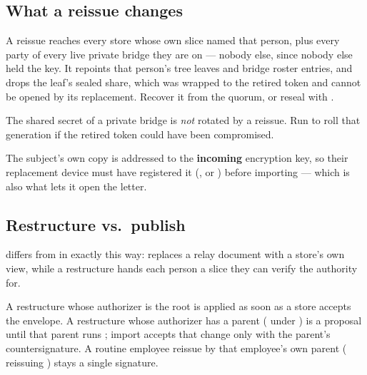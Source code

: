 \subsection{What a reissue changes}

A reissue reaches every store whose own slice named that person, plus every
party of every live private bridge they are on --- nobody else, since
nobody else held the key. It repoints that person's tree leaves and bridge
roster entries, and drops the leaf's sealed share, which was wrapped to the
retired token and cannot be opened by its replacement. Recover it from the
quorum, or reseal with .

\begin{cautionBox}
The shared secret of a private bridge is \emph{not} rotated by a reissue.
Run  to roll that generation if the
retired token could have been compromised.
\end{cautionBox}

The subject's own copy is addressed to the \textbf{incoming} encryption
key, so their replacement device must have registered it (, or ) before importing --- which is also what
lets it open the letter.

\subsection{Restructure vs.\ publish}

 differs from  in exactly this
way:  replaces a relay document with a store's own view,
while a restructure hands each person a slice they can verify the
authority for.

A restructure whose authorizer is the root is applied as soon as a store
accepts the envelope. A restructure whose authorizer has a parent
( under ) is a proposal until that parent runs ; import accepts that change only with the parent's
countersignature. A routine employee reissue by that employee's own parent
( reissuing ) stays a single signature.
